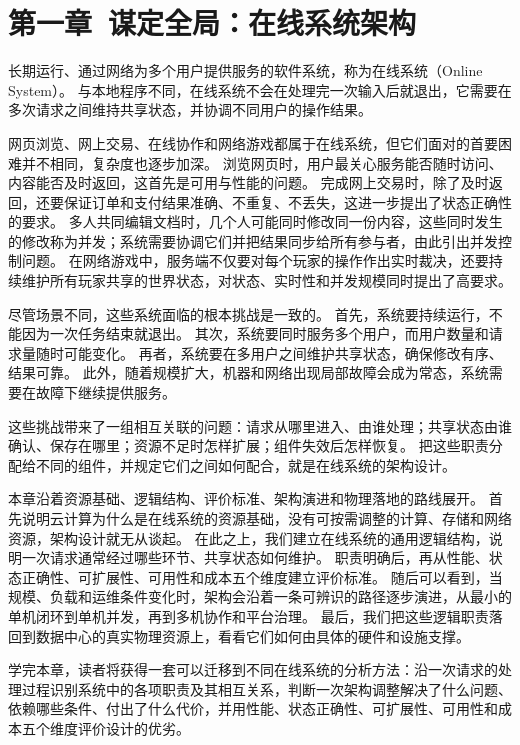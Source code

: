 \section{第一章\ 谋定全局：在线系统架构}\label{sec:chapter1}

长期运行、通过网络为多个用户提供服务的软件系统，称为在线系统（Online System）。
与本地程序不同，在线系统不会在处理完一次输入后就退出，它需要在多次请求之间维持共享状态，并协调不同用户的操作结果。

网页浏览、网上交易、在线协作和网络游戏都属于在线系统，但它们面对的首要困难并不相同，复杂度也逐步加深。
浏览网页时，用户最关心服务能否随时访问、内容能否及时返回，这首先是可用与性能的问题。
完成网上交易时，除了及时返回，还要保证订单和支付结果准确、不重复、不丢失，这进一步提出了状态正确性的要求。
多人共同编辑文档时，几个人可能同时修改同一份内容，这些同时发生的修改称为并发；系统需要协调它们并把结果同步给所有参与者，由此引出并发控制问题。
在网络游戏中，服务端不仅要对每个玩家的操作作出实时裁决，还要持续维护所有玩家共享的世界状态，对状态、实时性和并发规模同时提出了高要求。

尽管场景不同，这些系统面临的根本挑战是一致的。
首先，系统要持续运行，不能因为一次任务结束就退出。
其次，系统要同时服务多个用户，而用户数量和请求量随时可能变化。
再者，系统要在多用户之间维护共享状态，确保修改有序、结果可靠。
此外，随着规模扩大，机器和网络出现局部故障会成为常态，系统需要在故障下继续提供服务。

这些挑战带来了一组相互关联的问题：请求从哪里进入、由谁处理；共享状态由谁确认、保存在哪里；资源不足时怎样扩展；组件失效后怎样恢复。
把这些职责分配给不同的组件，并规定它们之间如何配合，就是在线系统的架构设计。

本章沿着资源基础、逻辑结构、评价标准、架构演进和物理落地的路线展开。
首先说明云计算为什么是在线系统的资源基础，没有可按需调整的计算、存储和网络资源，架构设计就无从谈起。
在此之上，我们建立在线系统的通用逻辑结构，说明一次请求通常经过哪些环节、共享状态如何维护。
职责明确后，再从性能、状态正确性、可扩展性、可用性和成本五个维度建立评价标准。
随后可以看到，当规模、负载和运维条件变化时，架构会沿着一条可辨识的路径逐步演进，从最小的单机闭环到单机并发，再到多机协作和平台治理。
最后，我们把这些逻辑职责落回到数据中心的真实物理资源上，看看它们如何由具体的硬件和设施支撑。

学完本章，读者将获得一套可以迁移到不同在线系统的分析方法：沿一次请求的处理过程识别系统中的各项职责及其相互关系，判断一次架构调整解决了什么问题、依赖哪些条件、付出了什么代价，并用性能、状态正确性、可扩展性、可用性和成本五个维度评价设计的优劣。

